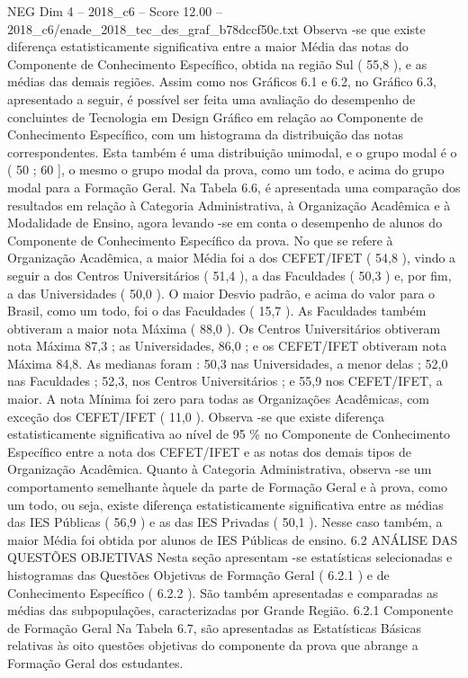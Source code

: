 \begin{textsample}{NEG Dim 4 – 2018\_c6 – Score 12.00 – 2018\_c6/enade\_2018\_tec\_des\_graf\_b78dccf50c.txt}
Observa -se que existe diferença estatisticamente significativa entre a maior Média das notas do Componente de Conhecimento Específico, obtida na região Sul ( 55,8 ), e as médias das demais regiões.
Assim como nos Gráficos 6.1 e 6.2, no Gráfico 6.3, apresentado a seguir, é possível ser feita uma avaliação do desempenho de concluintes de Tecnologia em Design Gráfico em relação ao Componente de Conhecimento Específico, com um histograma da distribuição das notas correspondentes.
Esta também é uma distribuição unimodal, e o grupo modal é o ( 50 ; 60 ], o mesmo o grupo modal da prova, como um todo, e acima do grupo modal para a Formação Geral.
Na Tabela 6.6, é apresentada uma comparação dos resultados em relação à Categoria Administrativa, à Organização Acadêmica e à Modalidade de Ensino, agora levando -se em conta o desempenho de alunos do Componente de Conhecimento Específico da prova.
No que se refere à Organização Acadêmica, a maior Média foi a dos CEFET/IFET ( 54,8 ), vindo a seguir a dos Centros Universitários ( 51,4 ), a das Faculdades ( 50,3 ) e, por fim, a das Universidades ( 50,0 ).
O maior Desvio padrão, e acima do valor para o Brasil, como um todo, foi o das Faculdades ( 15,7 ).
As Faculdades também obtiveram a maior nota Máxima ( 88,0 ).
Os Centros Universitários obtiveram nota Máxima 87,3 ; as Universidades, 86,0 ; e os CEFET/IFET obtiveram nota Máxima 84,8.
As medianas foram : 50,3 nas Universidades, a menor delas ; 52,0 nas Faculdades ; 52,3, nos Centros Universitários ; e 55,9 nos CEFET/IFET, a maior.
A nota Mínima foi zero para todas as Organizações Acadêmicas, com exceção dos CEFET/IFET ( 11,0 ).
Observa -se que existe diferença estatisticamente significativa ao nível de 95 \% no Componente de Conhecimento Específico entre a nota dos CEFET/IFET e as notas dos demais tipos de Organização Acadêmica.
Quanto à Categoria Administrativa, observa -se um comportamento semelhante àquele da parte de Formação Geral e à prova, como um todo, ou seja, existe diferença estatisticamente significativa entre as médias das IES Públicas ( 56,9 ) e as das IES Privadas ( 50,1 ).
Nesse caso também, a maior Média foi obtida por alunos de IES Públicas de ensino. 6.2 ANÁLISE DAS QUESTÕES OBJETIVAS Nesta seção apresentam -se estatísticas selecionadas e histogramas das Questões Objetivas de Formação Geral ( 6.2.1 ) e de Conhecimento Específico ( 6.2.2 ).
São também apresentadas e comparadas as médias das subpopulações, caracterizadas por Grande Região. 6.2.1 Componente de Formação Geral Na Tabela 6.7, são apresentadas as Estatísticas Básicas relativas às oito questões objetivas do componente da prova que abrange a Formação Geral dos estudantes.

\end{textsample}
